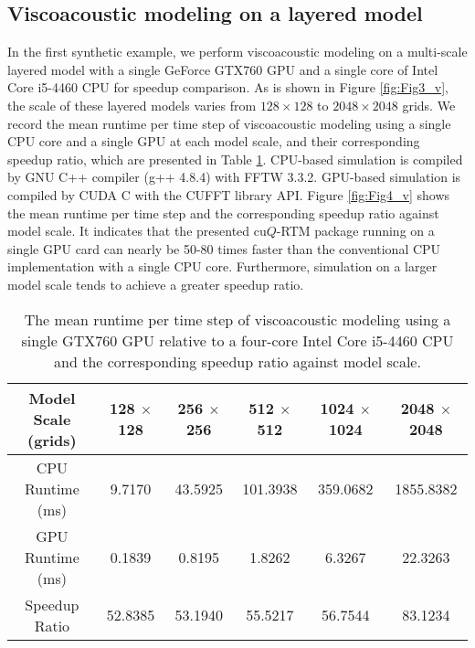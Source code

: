 \subsection{Viscoacoustic modeling on a layered model}

In the first synthetic example, we perform viscoacoustic modeling on a multi-scale layered model with a single GeForce GTX760 GPU and a single core of Intel Core i5-4460 CPU for speedup comparison. As is shown in Figure \ref{fig:Fig3_v}, the scale of these layered models varies from $128\times 128$ to $2048\times 2048$ grids. We record the mean runtime per time step of viscoacoustic modeling using a single CPU core and a single GPU at each model scale, and their corresponding speedup ratio, which are presented in Table \ref{tbl:tab2}. CPU-based simulation is compiled by GNU C++ compiler (g++ 4.8.4) with FFTW 3.3.2. GPU-based simulation is compiled by CUDA C with the CUFFT library API. Figure \ref{fig:Fig4_v} shows the mean runtime per time step and the corresponding speedup ratio against model scale. It indicates that the presented cu$Q$-RTM package running on a single GPU card can nearly be 50-80 times faster than the conventional CPU implementation with a single CPU core. Furthermore, simulation on a larger model scale tends to achieve a greater speedup ratio.



\begin{table}
\caption{The mean runtime per time step of viscoacoustic modeling using  a single GTX760 GPU relative to a four-core Intel Core i5-4460 CPU and the corresponding speedup ratio against model scale.}
\label{tbl:tab2}
\begin{center}
\begin{tabular}{|c|c|c|c|c|c|}
\hline Model Scale (grids) & 128 $\times$ 128  & 256 $\times$ 256 & 512 $\times$ 512 & 1024 $\times$ 1024 & 2048 $\times$ 2048\\
\hline CPU Runtime (ms) & 9.7170 & 43.5925 & 101.3938 & 359.0682 & 1855.8382\\
\hline GPU Runtime (ms) & 0.1839 & 0.8195 & 1.8262 & 6.3267 & 22.3263\\
\hline Speedup Ratio & 52.8385 & 53.1940 & 55.5217 & 56.7544 & 83.1234\\
\hline
\end{tabular} 
\end{center}
\end{table}


